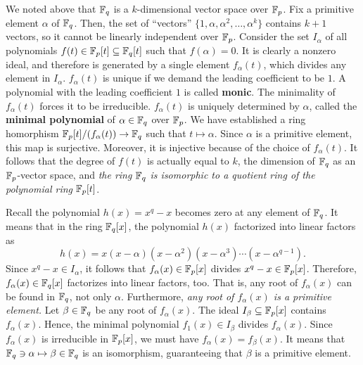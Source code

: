 We noted above that $\mathbb{F}_q$ is a $k$-dimensional vector space over $\mathbb{F}_p$.
Fix a primitive element $\alpha$ of $\mathbb{F}_q$.
Then, the set of ``vectors''  $\{1,\alpha,\alpha^2,\ldots,\alpha^k\}$ contains $k+1$ vectors,
so it cannot be linearly independent over $\mathbb{F}_p$.
Consider the set $I_\alpha$ of all polynomials $f(t) \in \mathbb{F}_p[t] \subseteq \mathbb{F}_q[t]$ such that $f(\alpha) = 0$.
It is clearly a nonzero ideal, and therefore is generated by a single element $f_\alpha(t)$,
which divides any element in $I_\alpha$.
$f_\alpha(t)$ is unique if we demand the leading coefficient to be $1$.
A polynomial with the leading coefficient $1$ is called {\bf monic}.
The minimality of $f_\alpha(t)$ forces it to be irreducible.
$f_\alpha(t)$ is uniquely determined by $\alpha$, 
called the {\bf minimal polynomial} of $\alpha \in \mathbb{F}_q$ over $\mathbb{F}_p$.
We have established a ring homorphism $\mathbb{F}_p[t] / (f_\alpha(t)) \to \mathbb{F}_q$ such that $t \mapsto \alpha$.
Since $\alpha$ is a primitive element, this map is surjective.
Moreover, it is injective because of the choice of $f_\alpha(t)$.
It follows that the degree of $f(t)$ is actually equal to $k$,
the dimension of $\mathbb{F}_q$ as an $\mathbb{F}_p$-vector space,
and {\em the ring $\mathbb{F}_q$ is isomorphic to a quotient ring of the polynomial ring $\mathbb{F}_p[t]$}.


Recall the polynomial $h(x) = x^q -x$ becomes zero at any element of $\mathbb{F}_q$.
It means that in the ring $\mathbb{F}_q[x]$,
the polynomial $h(x)$ factorized into linear factors as
\begin{equation}
h(x) = x(x-\alpha)(x-\alpha^2)(x-\alpha^3) \cdots (x- \alpha^{q-1}) .
\label{h-factors}
\end{equation}
Since $x^q-x \in I_\alpha$, it follows that $f_\alpha(x) \in \mathbb{F}_p[x]$ divides $x^q-x \in \mathbb{F}_p[x]$.
Therefore, $f_\alpha(x) \in \mathbb{F}_q[x]$ factorizes into linear factors, too.
That is, any root of $f_\alpha(x)$ can be found in $\mathbb{F}_q$, not only $\alpha$.
Furthermore, {\em any root of $f_\alpha(x)$ is a primitive element.}
Let $\beta \in \mathbb{F}_q$ be any root of $f_\alpha(x)$.
The ideal $I_\beta \subseteq \mathbb{F}_p[x]$ contains $f_\alpha(x)$.
Hence, the minimal polynomial $f_1(x) \in I_\beta$ divides $f_\alpha(x)$.
Since $f_\alpha(x)$ is irreducible in $\mathbb{F}_p[x]$, we must have $f_\alpha(x) = f_\beta(x)$.
It means that $\mathbb{F}_q \ni \alpha \mapsto \beta \in \mathbb{F}_q$ is an isomorphism,
guaranteeing that $\beta$ is a primitive element.


